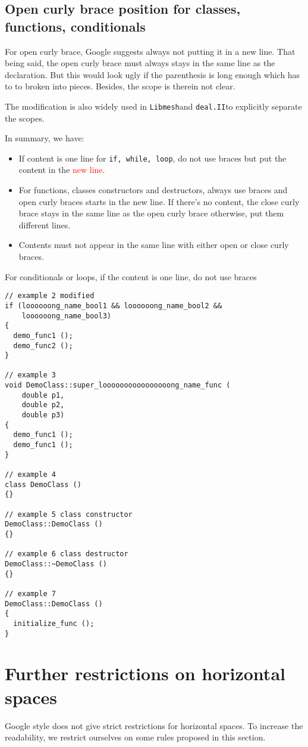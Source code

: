 \documentclass{article}
\newcommand{\libmesh}{{\tt Libmesh}}
\newcommand{\dealii}{{\tt deal.II}}
\newcommand{\red}[1]{\textcolor{red}{#1}}
\begin{document}
\subsection{Open curly brace position for classes, functions, conditionals}
For open curly brace, Google suggests always not putting it in a new line. That being said, the open curly brace must always stays in the same line as the declaration. But this would look ugly if the parenthesis is long enough which has to to broken into pieces. Besides, the scope is therein not clear.

The modification is also widely used in \libmesh and \dealii to explicitly separate the scopes.

In summary, we have:
\begin{itemize}
	\item If content is one line for {\tt if, while, loop}, do not use braces but put the content in the \red{new line}.
	\item For functions, classes constructors and destructors, always use braces and open curly braces starts in the new line. If there's no content, the close curly brace stays in the same line as the open curly brace otherwise, put them different lines.
	\item Contents must not appear in the same line with either open or close curly braces.
\end{itemize}

For conditionals or loops, if the content is one line, do not use braces
\begin{lstlisting}
// example 2 modified
if (loooooong_name_bool1 && loooooong_name_bool2 &&
    loooooong_name_bool3) 
{
  demo_func1 ();
  demo_func2 ();
}

// example 3
void DemoClass::super_loooooooooooooooong_name_func (
    double p1,
    double p2,
    double p3) 
{
  demo_func1 ();
  demo_func1 ();
}

// example 4
class DemoClass ()
{}

// example 5 class constructor
DemoClass::DemoClass ()
{}

// example 6 class destructor
DemoClass::~DemoClass ()
{}

// example 7
DemoClass::DemoClass ()
{
  initialize_func ();
}
\end{lstlisting}

\section{Further restrictions on horizontal spaces}
Google style does not give strict restrictions for horizontal spaces. To increase the readability, we restrict ourselves on some rules proposed in this section.
\end{document}
